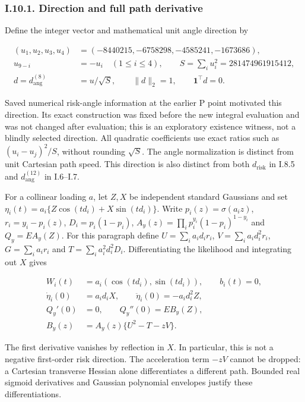\documentclass{article}
\begin{document}
\subsubsection*{I.10.1. Direction and full path
derivative}\label{i.10.1.-direction-and-full-path-derivative}

Define the integer vector and mathematical unit angle direction by

\[
\begin{aligned}
(u_1,u_2,u_3,u_4)&=(-8440215,-6758298,-4585241,-1673686),\\
u_{9-i}&=-u_i\quad(1\le i\le4),\qquad S=\sum_i u_i^2=281474961915412,\\
d=d_{\mathrm{ang}}^{(8)}&=u/\sqrt S,\qquad \|d\|_2=1,\qquad \mathbf1^\top d=0.
\end{aligned}
\tag{I.46}
\]

Saved numerical risk-angle information at the earlier P point motivated
this direction. Its exact construction was fixed before the new integral
evaluation and was not changed after evaluation; this is an exploratory
existence witness, not a blindly selected direction. All quadratic
coefficients use exact ratios such as \((u_i-u_j)^2/S\), without
rounding \(\sqrt S\). The angle normalization is distinct from unit
Cartesian path speed. This direction is also distinct from both
\(d_{\mathrm{risk}}\) in I.8.5 and \(d_{\mathrm{ang}}^{(12)}\) in
I.6--I.7.

For a collinear loading \(a\), let \(Z,X\) be independent standard
Gaussians and set \(\eta_i(t)=a_i\{Z\cos(td_i)+X\sin(td_i)\}\). Write
\(p_i(z)=\sigma(a_i z)\), \(r_i=y_i-p_i(z)\), \(D_i=p_i(1-p_i)\),
\(A_y(z)=\prod_i p_i^{y_i}(1-p_i)^{1-y_i}\) and \(Q_y=E A_y(Z)\). For
this paragraph define \(U=\sum_i a_i d_i r_i\),
\(V=\sum_i a_i d_i^2r_i\), \(G=\sum_i a_i r_i\) and
\(T=\sum_i a_i^2d_i^2D_i\). Differentiating the likelihood and
integrating out \(X\) gives

\[
\begin{aligned}
W_i(t)&=a_i(\cos(td_i),\sin(td_i)),\qquad b_i(t)=0,\\
\dot\eta_i(0)&=a_i d_iX,\qquad \ddot\eta_i(0)=-a_i d_i^2Z,\\
Q_y'(0)&=0,\qquad Q_y''(0)=E B_y(Z),\\
B_y(z)&=A_y(z)\{U^2-T-zV\}.
\end{aligned}
\tag{I.47}
\]

The first derivative vanishes by reflection in \(X\). In particular,
this is not a negative first-order risk direction. The acceleration term
\(-zV\) cannot be dropped: a Cartesian transverse Hessian alone
differentiates a different path. Bounded real sigmoid derivatives and
Gaussian polynomial envelopes justify these differentiations.
\end{document}
